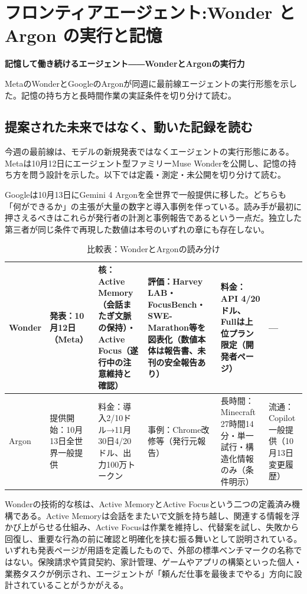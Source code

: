 \documentclass[lualatex,a4paper,10pt]{jlreq}
\begin{document}
\surveycover
\clearpage
\twocolumn
\section{フロンティアエージェント:Wonder と Argon の実行と記憶}
\label{sec:P1}

{\Large\bfseries 記憶して働き続けるエージェント――WonderとArgonの実行力\par}
\smallskip
{\color{SurveyMuted}MetaのWonderとGoogleのArgonが同週に最前線エージェントの実行形態を示した。記憶の持ち方と長時間作業の実証条件を切り分けて読む。\par}
\bigskip

\subsection*{提案された未来ではなく、動いた記録を読む}

今週の最前線は、モデルの新規発表ではなくエージェントの実行形態にある。Metaは10月12日にエージェント型ファミリーMuse Wonderを公開し、記憶の持ち方を問う設計を示した。以下では定義・測定・未公開を切り分けて読む。
\cite{B01,B02,B03}


Googleは10月13日にGemini 4 Argonを全世界で一般提供に移した。どちらも「何ができるか」の主張が大量の数字と導入事例を伴っている。読み手が最初に押さえるべきはこれらが発行者の計測と事例報告であるという一点だ。独立した第三者が同じ条件で再現した数値は本号のいずれの章にも存在しない。
\cite{B04,B05,B06,B07,B08}


\begin{table}[htbp]\centering\footnotesize
\caption{比較表：WonderとArgonの読み分け}
\begin{tabularx}{0.96\linewidth}{@{}lXXXXX@{}}
\toprule
Wonder & 発表：10月12日（Meta） & 核：Active Memory（会話またぎ文脈の保持）・Active Focus（遂行中の注意維持と確認） & 評価：Harvey LAB・FocusBench・SWE-Marathon等を図表化（数値本体は報告書、未刊の安全報告あり） & 料金：API 4/20ドル、Fullは上位プラン限定（開発者ページ） & --- \cite{B01,B03,B02} \\
\midrule
Argon & 提供開始：10月13日全世界一般提供 & 料金：導入2/10ドル→11月30日4/20ドル、出力100万トークン & 事例：Chrome改修等（発行元報告） & 長時間：Minecraft 27時間14分・単一試行・構造化情報のみ（条件明示） & 流通：Copilot一般提供（10月13日変更履歴） \cite{B05,B06,B07,B04} \\
\bottomrule
\end{tabularx}
\end{table}

Wonderの技術的な核は、Active MemoryとActive Focusという二つの定義済み機構である。Active Memoryは会話をまたいで文脈を持ち越し、関連する情報を浮かび上がらせる仕組み、Active Focusは作業を維持し、代替案を試し、失敗から回復し、重要な行為の前に確認と明確化を挟む振る舞いとして説明されている。いずれも発表ページが用語を定義したもので、外部の標準ベンチマークの名称ではない。保険請求や賃貸契約、家計管理、ゲームやアプリの構築といった個人・業務タスクが例示され、エージェントが「頼んだ仕事を最後までやる」方向に設計されていることがうかがえる。
\cite{B01,B02,B03}
\end{document}
